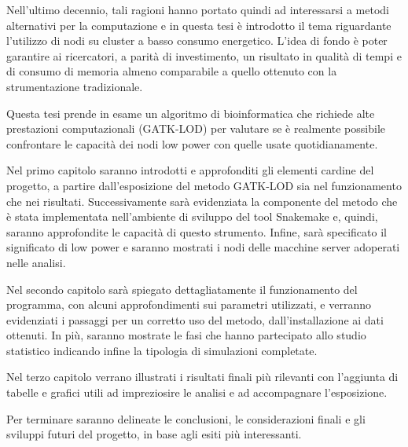 \documentclass[12pt, a4paper]{report}
\begin{document}
Nell'ultimo decennio, tali ragioni hanno portato quindi ad interessarsi a metodi alternativi per la computazione e in questa tesi è introdotto il tema riguardante l'utilizzo di nodi su cluster a basso consumo energetico.
L'idea di fondo è poter garantire ai ricercatori, a parità di investimento, un risultato in qualità di tempi e di consumo di memoria almeno comparabile a quello ottenuto con la strumentazione tradizionale.

Questa tesi prende in esame un algoritmo di bioinformatica che richiede alte prestazioni computazionali (GATK-LOD) per valutare se è realmente possibile confrontare le capacità dei nodi low power con quelle usate quotidianamente.  

Nel primo capitolo saranno introdotti e approfonditi gli elementi cardine del progetto, a partire dall'esposizione del metodo GATK-LOD sia nel funzionamento che nei risultati.
Successivamente sarà evidenziata la componente del metodo che è stata implementata nell'ambiente di sviluppo del tool Snakemake e, quindi, saranno approfondite le capacità di questo strumento.
Infine, sarà specificato il significato di low power e saranno mostrati i nodi delle macchine server adoperati nelle analisi.

Nel secondo capitolo sarà spiegato dettagliatamente il funzionamento del programma, con alcuni approfondimenti sui parametri utilizzati, e verranno evidenziati i passaggi per un corretto uso del metodo, dall'installazione ai dati ottenuti.
In più, saranno mostrate le fasi che hanno partecipato allo studio statistico indicando infine la tipologia di simulazioni completate.

Nel terzo capitolo verrano illustrati i risultati finali più rilevanti con l'aggiunta di tabelle e grafici utili ad impreziosire le analisi e ad accompagnare l'esposizione.

Per terminare saranno delineate le conclusioni, le considerazioni finali e gli sviluppi futuri del progetto, in base agli esiti più interessanti.

\tableofcontents







\end{document}
